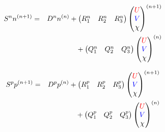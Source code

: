\begin{eqnarray}
  \label{eq:density_advance}
  S^n n^{(n+1)} & = & D^n n^{(n)} + 
  \begin{pmatrix} R^n_1 & R^n_2 & R^n_3\end{pmatrix}
  \begin{pmatrix}\textcolor{red}{U}\\ \textcolor{blue}{V}\\ \chi\end{pmatrix}^{(n+1)}
  \\ & & \mbox{} + 
  \begin{pmatrix}Q^n_1    &   Q^n_2   & Q^n_3\end{pmatrix}
  \begin{pmatrix}\textcolor{red}{U}\\ \textcolor{blue}{V}\\ \chi\end{pmatrix}^{(n)} \nonumber
\end{eqnarray}


\begin{eqnarray}
  \label{eq:pressure_advance}
  S^p p^{(n+1)} & = & D^p p^{(n)} + 
  \begin{pmatrix}R^p_1 & R^p_2 & R^p_3\end{pmatrix}
  \begin{pmatrix}\textcolor{red}{U}\\ \textcolor{blue}{V}\\ \chi \end{pmatrix}^{(n+1)}
  \\ & & \mbox{} + 
  \begin{pmatrix}Q^p_1 & Q^p_2 & Q^p_3\end{pmatrix}
  \begin{pmatrix}\textcolor{red}{U}\\ \textcolor{blue}{V}\\ \chi \end{pmatrix}^{(n)} \nonumber
\end{eqnarray}


